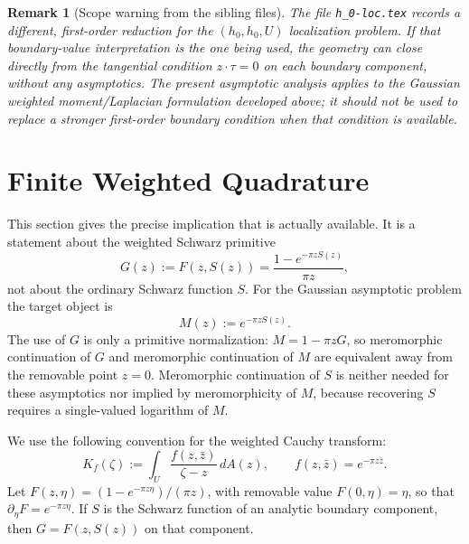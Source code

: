 \documentclass[11pt]{article}
\newtheorem{remark}[theorem]{Remark}
\newcommand{\dd}{\,d}
\newcommand{\1}{\mathbf 1}
\begin{document}
\begin{remark}[Scope warning from the sibling files]
The file \texttt{h\_0-loc.tex} records a different, first-order reduction for the
\((h_0,h_0,U)\) localization problem. If that boundary-value interpretation is the one
being used, the geometry can close directly from the tangential condition
\(z\cdot\tau=0\) on each boundary component, without any asymptotics. The present
asymptotic analysis applies to the Gaussian weighted moment/Laplacian formulation
developed above; it should not be used to replace a stronger first-order boundary
condition when that condition is available.
\end{remark}



\section{Finite Weighted Quadrature}

This section gives the precise implication that is actually available. It is a statement
about the weighted Schwarz primitive
\[
  G(z):=F(z,S(z))=\frac{1-e^{-\pi zS(z)}}{\pi z},
\]
not about the ordinary Schwarz function \(S\). For the Gaussian asymptotic problem the
target object is
\[
  M(z):=e^{-\pi zS(z)}.
\]
The use of \(G\) is only a primitive normalization: \(M=1-\pi zG\), so meromorphic
continuation of \(G\) and meromorphic continuation of \(M\) are equivalent away from the
removable point \(z=0\). Meromorphic continuation of \(S\) is neither needed for these
asymptotics nor implied by meromorphicity of \(M\), because recovering \(S\) requires a
single-valued logarithm of \(M\).

We use the following convention for the weighted Cauchy transform:
\begin{equation}\label{eq:weighted-cauchy-K}
  K_f(\zeta):=\int_U \frac{f(z,\bar z)}{\zeta-z}\dd A(z),
  \qquad f(z,\bar z)=e^{-\pi z\bar z}.
\end{equation}
Let \(F(z,\eta)=(1-e^{-\pi z\eta})/(\pi z)\), with removable value \(F(0,\eta)=\eta\), so
that \(\partial_\eta F=e^{-\pi z\eta}\). If \(S\) is the Schwarz function of an analytic
boundary component, then \(G=F(z,S(z))\) on that component.
\end{document}
